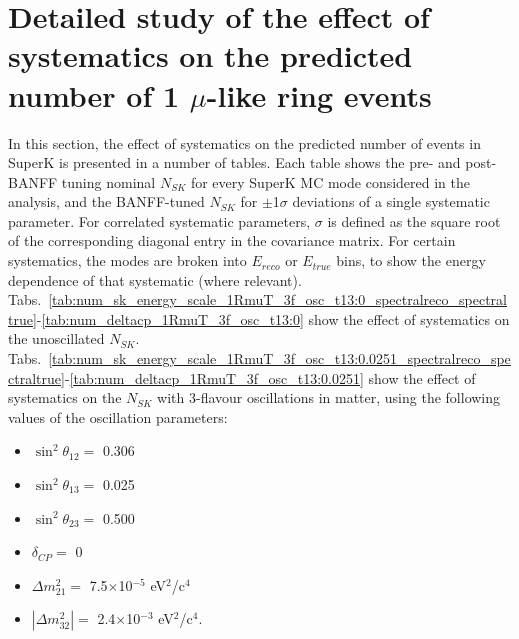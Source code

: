 \clearpage

\section{Detailed study of the effect of systematics on the predicted number of 1 $\mu$-like ring events}
\label{sec:nsk_systematics}

In this section, the effect of systematics on the predicted number of events in SuperK is presented in a number of tables. 
Each table shows the pre- and post-BANFF tuning nominal $N_{SK}$ for every SuperK MC mode considered in the analysis, and 
the BANFF-tuned $N_{SK}$ for $\pm$1$\sigma$ deviations of a single systematic parameter. For correlated systematic parameters, 
$\sigma$ is defined as the square root of the corresponding diagonal entry in the covariance matrix.
For certain systematics, the modes are broken into $E_{reco}$ or $E_{true}$ bins, to show the energy dependence of that systematic 
(where relevant).
Tabs.\ \ref{tab:num_sk_energy_scale_1RmuT_3f_osc_t13:0_spectralreco_spectraltrue}-\ref{tab:num_deltacp_1RmuT_3f_osc_t13:0} 
show the effect of systematics on the unoscillated $N_{SK}$.
Tabs.\ \ref{tab:num_sk_energy_scale_1RmuT_3f_osc_t13:0.0251_spectralreco_spectraltrue}-\ref{tab:num_deltacp_1RmuT_3f_osc_t13:0.0251} 
show the effect of systematics on the $N_{SK}$ with 3-flavour oscillations in matter, using the following values of the oscillation parameters:
\begin{itemize}
\item $\sin^2\theta_{12} = $ 0.306
\item $\sin^2\theta_{13} = $ 0.025
\item $\sin^2\theta_{23} = $ 0.500
\item $\delta_{CP} = $        0
\item $\Delta m^2_{21} = $    7.5$\times$10$^{-5}$ eV$^{2}$/c$^{4}$
\item $|\Delta m^2_{32}| = $  2.4$\times$10$^{-3}$ eV$^{2}$/c$^{4}$.
\end{itemize}





